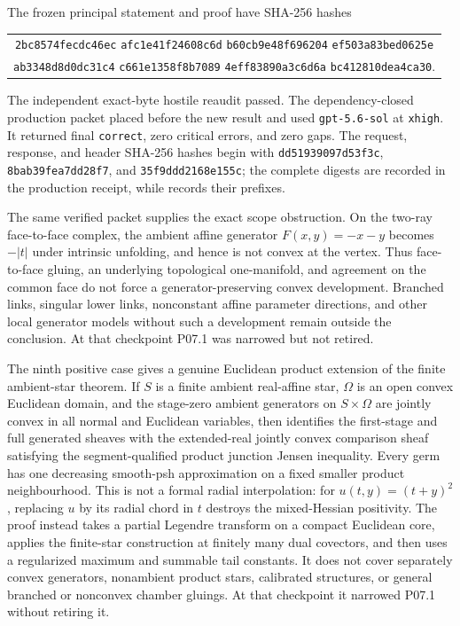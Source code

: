 The frozen principal statement and proof have SHA-256 hashes
\begin{center}
\small
\begin{tabular}{@{}c@{}}
\texttt{2bc8574fecdc46ec}\allowbreak
\texttt{afc1e41f24608c6d}\allowbreak
\texttt{b60cb9e48f696204}\allowbreak
\texttt{ef503a83bed0625e}\\
\texttt{ab3348d8d0dc31c4}\allowbreak
\texttt{c661e1358f8b7089}\allowbreak
\texttt{4eff83890a3c6d6a}\allowbreak
\texttt{bc412810dea4ca30}.
\end{tabular}
\end{center}
The independent exact-byte hostile reaudit passed.  The dependency-closed
production packet placed
 before the new result and used
\texttt{gpt-5.6-sol} at \texttt{xhigh}.  It returned final
\texttt{correct}, zero critical errors, and zero gaps.  The request,
response, and header SHA-256 hashes begin with
\texttt{dd51939097d53f3c}, \texttt{8bab39fea7dd28f7}, and
\texttt{35f9ddd2168e155c}; the complete digests are recorded in the
production receipt, while  records their prefixes.

The same verified packet supplies the exact scope obstruction.  On the
two-ray face-to-face complex, the ambient affine generator
\(F(x,y)=-x-y\) becomes \(-|t|\) under intrinsic unfolding, and hence is not
convex at the vertex.  Thus face-to-face gluing, an underlying topological
one-manifold, and agreement on the common face do not force a
generator-preserving convex development.  Branched links, singular lower
links, nonconstant affine parameter directions, and other local generator
models without such a development remain outside the conclusion.  At that checkpoint P07.1
was narrowed but not retired.

The ninth positive case gives a genuine Euclidean product extension of the
finite ambient-star theorem.  If \(S\) is a finite ambient real-affine star,
\(\Omega\) is an open convex Euclidean domain, and the stage-zero ambient
generators on \(S\times\Omega\) are jointly convex in all normal and
Euclidean variables, then
 identifies the first-stage
and full generated sheaves with the extended-real jointly convex comparison
sheaf satisfying the segment-qualified product junction Jensen inequality.
Every germ has one decreasing smooth-psh approximation on a fixed smaller
product neighbourhood.  This is not a formal radial interpolation: for
\(u(t,y)=(t+y)^2\), replacing \(u\) by its radial chord in \(t\) destroys
the mixed-Hessian positivity.  The proof instead takes a partial Legendre
transform on a compact Euclidean core, applies the finite-star construction
at finitely many dual covectors, and then uses a regularized maximum and
summable tail constants.  It does not cover separately convex generators,
nonambient product stars, calibrated structures, or general branched or
nonconvex chamber gluings.  At that checkpoint it narrowed P07.1 without retiring it.

